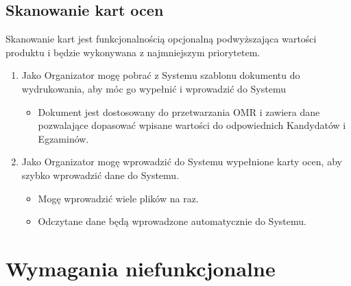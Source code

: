 \documentclass{article}
\begin{document}
\subsection{Skanowanie kart ocen}
Skanowanie kart jest funkcjonalnością opcjonalną podwyższająca wartości produktu i będzie wykonywana z najmniejszym priorytetem.
\begin{enumerate}
  \item Jako Organizator mogę pobrać z Systemu szablonu dokumentu do wydrukowania, aby móc go wypełnić i wprowadzić do Systemu
    \begin{itemize}
        \item Dokument jest dostosowany do przetwarzania OMR i zawiera dane pozwalające dopasować wpisane wartości do odpowiednich Kandydatów i Egzaminów.
    \end{itemize}
  \item Jako Organizator mogę wprowadzić do Systemu wypełnione karty ocen, aby szybko wprowadzić dane do Systemu.
    \begin{itemize}
        \item Mogę wprowadzić wiele plików na raz.
        \item Odczytane dane będą wprowadzone automatycznie do Systemu.
   \end{itemize}
\end{enumerate}

\section{Wymagania niefunkcjonalne}
\end{document}
